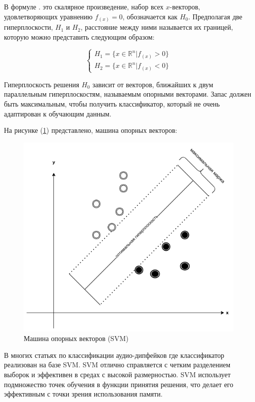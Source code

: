 В формуле \(.\) это скалярное произведение, набор всех \(x\)-векторов, удовлетворяющих уравнению \(f_{(x)} = 0\), обозначается как \(H_{0}\). Предполагая две гиперплоскости, \(H_{1}\) и \(H_{2}\), расстояние между ними называется их границей, которую можно представить следующим образом:

\begin{equation}
    \begin{cases}
        H_{1} = \{x \in \mathbb{R}^{n} | f_{(x)} > 0\} \\
        H_{2} = \{x \in \mathbb{R}^{n} | f_{(x)} < 0\}
    \end{cases}
\end{equation}

Гиперплоскость решения \(H_{0}\) зависит от векторов, ближайших к двум параллельным гиперплоскостям, называемым опорными векторами. Запас должен быть максимальным, чтобы получить классификатор, который не очень адаптирован к обучающим данным.

На рисунке (\ref{fig:support-vector-machine}) представлено, машина опорных векторов: 
\begin{figure}[H]
	\centering
	\includegraphics[width=0.4\linewidth]{images/support-vector-machine.png}
	\caption{Машина опорных векторов (SVM)}
	\label{fig:support-vector-machine}
\end{figure}

В многих статьях по классификации аудио-дипфейков где классификатор реализован на базе SVM. SVM отлично справляется с четким разделением выборок и эффективен в средах с высокой размерностью. SVM использует подмножество точек обучения в функции принятия решения, что делает его эффективным с точки зрения использования памяти.

% 

